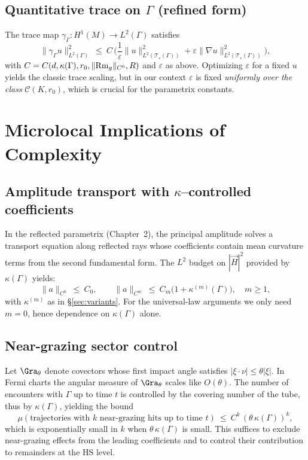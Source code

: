 \subsection{Quantitative trace on $\Gamma$ (refined form)}
\label{subsec:refined-trace}
The trace map $\gamma_\Gamma:H^1(M)\to L^2(\Gamma)$ satisfies
\[
\|\gamma_\Gamma u\|_{L^2(\Gamma)}^2\ \le\ C\,\Big(\frac{1}{\varepsilon}\|u\|_{L^2(\mathcal{T}_\varepsilon(\Gamma))}^2+\varepsilon \|\nabla u\|_{L^2(\mathcal{T}_\varepsilon(\Gamma))}^2\Big),
\]
with $C=C(d,\kappa(\Gamma),r_0,\|{\rm Rm}_g\|_{C^0},R)$ and $\varepsilon$ as above. Optimizing $\varepsilon$ for a fixed $u$ yields the classic trace scaling, but in our context $\varepsilon$ is fixed \emph{uniformly over the class} $\mathcal{C}(K,r_0)$, which is crucial for the parametrix constants.

\section{Microlocal Implications of Complexity}
\label{sec:microlocal-complexity}

\subsection{Amplitude transport with $\kappa$–controlled coefficients}
In the reflected parametrix (Chapter~2), the principal amplitude solves a transport equation along reflected rays whose coefficients contain mean curvature terms from the second fundamental form. The $L^2$ budget on $|\vec H|^2$ provided by $\kappa(\Gamma)$ yields:
\[
\|a\|_{C^0}\ \le\ C_0,\qquad \|a\|_{C^m}\ \le\ C_m\Big(1+\kappa^{(m)}(\Gamma)\Big),\quad m\ge 1,
\]
with $\kappa^{(m)}$ as in \S\ref{sec:variants}. For the universal-law arguments we only need $m=0$,
hence dependence on $\kappa(\Gamma)$ alone.

\subsection{Near-grazing sector control}
Let $\Gra_\theta$ denote covectors whose first impact angle satisfies $|\xi\cdot\nu|\le \theta|\xi|$. In Fermi charts the angular measure of $\Gra_\theta$ scales like $O(\theta)$. The number of encounters with $\Gamma$ up to time $t$ is controlled by the covering number of the tube, thus by $\kappa(\Gamma)$, yielding the bound
\[
\mu(\text{trajectories with $k$ near-grazing hits up to time }t)\ \le\ C^k\,(\theta\,\kappa(\Gamma))^k,
\]
which is exponentially small in $k$ when $\theta\,\kappa(\Gamma)$ is small. This suffices to exclude near-grazing effects from the leading coefficients and to control their contribution to remainders at the HS level.

